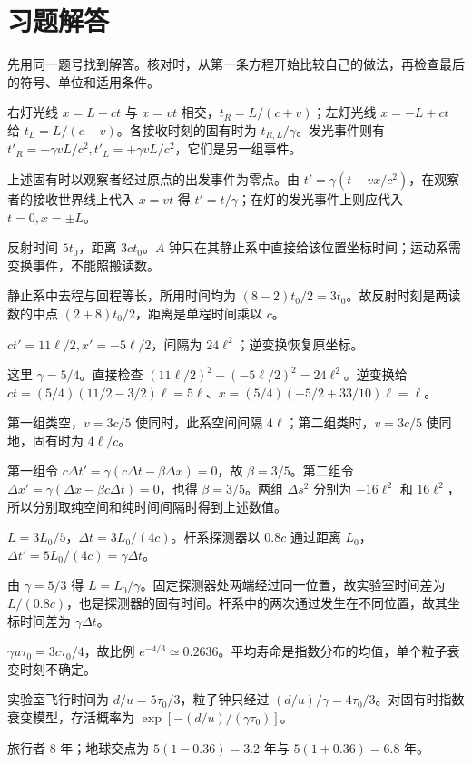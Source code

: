 \section*{习题解答}
先用同一题号找到解答。核对时，从第一条方程开始比较自己的做法，再检查最后的符号、单位和适用条件。
\begin{bookexercises}
\item 右灯光线 $x=L-ct$ 与 $x=vt$ 相交，$t_R=L/(c+v)$；左灯光线 $x=-L+ct$ 给 $t_L=L/(c-v)$。各接收时刻的固有时为 $t_{R,L}/\gamma$。发光事件则有 $t'_R=-\gamma vL/c^2,t'_L=+\gamma vL/c^2$，它们是另一组事件。

上述固有时以观察者经过原点的出发事件为零点。由 $t'=\gamma(t-vx/c^2)$，在观察者的接收世界线上代入 $x=vt$ 得 $t'=t/\gamma$；在灯的发光事件上则应代入 $t=0,x=\pm L$。
\item 反射时间 $5t_0$，距离 $3ct_0$。$A$ 钟只在其静止系中直接给该位置坐标时间；运动系需变换事件，不能照搬读数。

静止系中去程与回程等长，所用时间均为 $(8-2)t_0/2=3t_0$。故反射时刻是两读数的中点 $(2+8)t_0/2$，距离是单程时间乘以 $c$。
\item $ct'=11\ell/2,x'=-5\ell/2$，间隔为 $24\ell^2$；逆变换恢复原坐标。

这里 $\gamma=5/4$。直接检查 $(11\ell/2)^2-(-5\ell/2)^2=24\ell^2$。逆变换给 $ct=(5/4)(11/2-3/2)\ell=5\ell$、$x=(5/4)(-5/2+33/10)\ell=\ell$。
\item 第一组类空，$v=3c/5$ 使同时，此系空间间隔 $4\ell$；第二组类时，$v=3c/5$ 使同地，固有时为 $4\ell/c$。

第一组令 $c\Delta t'=\gamma(c\Delta t-\beta\Delta x)=0$，故 $\beta=3/5$。第二组令 $\Delta x'=\gamma(\Delta x-\beta c\Delta t)=0$，也得 $\beta=3/5$。两组 $\Delta s^2$ 分别为 $-16\ell^2$ 和 $16\ell^2$，所以分别取纯空间和纯时间间隔时得到上述数值。
\item $L=3L_0/5$，$\Delta t=3L_0/(4c)$。杆系探测器以 $0.8c$ 通过距离 $L_0$，$\Delta t'=5L_0/(4c)=\gamma\Delta t$。

由 $\gamma=5/3$ 得 $L=L_0/\gamma$。固定探测器处两端经过同一位置，故实验室时间差为 $L/(0.8c)$，也是探测器的固有时间。杆系中的两次通过发生在不同位置，故其坐标时间差为 $\gamma\Delta t$。
\item $\gamma u\tau_0=3c\tau_0/4$，故比例 $e^{-4/3}\simeq0.2636$。平均寿命是指数分布的均值，单个粒子衰变时刻不确定。

实验室飞行时间为 $d/u=5\tau_0/3$，粒子钟只经过 $(d/u)/\gamma=4\tau_0/3$。对固有时指数衰变模型，存活概率为 $\exp[-(d/u)/(\gamma\tau_0)]$。
\item 旅行者 $8$ 年；地球交点为 $5(1-0.36)=3.2$ 年与 $5(1+0.36)=6.8$ 年。


\end{bookexercises}
